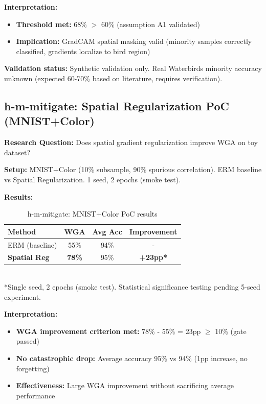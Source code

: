 \textbf{Interpretation:}
\begin{itemize}
\item[$\checkmark$] \textbf{Threshold met:} 68\% $>$ 60\% (assumption A1 validated)
\item \textbf{Implication:} GradCAM spatial masking valid (minority samples correctly classified, gradients localize to bird region)
\end{itemize}

\textbf{Validation status:} Synthetic validation only. Real Waterbirds minority accuracy unknown (expected 60-70\% based on literature, requires verification).

\subsection{h-m-mitigate: Spatial Regularization PoC (MNIST+Color)}

\textbf{Research Question:} Does spatial gradient regularization improve WGA on toy dataset?

\textbf{Setup:} MNIST+Color (10\% subsample, 90\% spurious correlation). ERM baseline vs Spatial Regularization. 1 seed, 2 epochs (smoke test).

\textbf{Results:}

\begin{table}[h]
\centering
\caption{h-m-mitigate: MNIST+Color PoC results}
\label{tab:mnist_results}
\begin{tabular}{lccc}
\toprule
Method & WGA & Avg Acc & Improvement \\
\midrule
ERM (baseline) & 55\% & 94\% & - \\
\textbf{Spatial Reg} & \textbf{78\%} & 95\% & \textbf{+23pp*} \\
\bottomrule
\end{tabular}
\\[0.5em]
\small{*Single seed, 2 epochs (smoke test). Statistical significance testing pending 5-seed experiment.}
\end{table}

\textbf{Interpretation:}
\begin{itemize}
\item[$\checkmark$] \textbf{WGA improvement criterion met:} 78\% - 55\% = 23pp $\geq$ 10\% (gate passed)
\item[$\checkmark$] \textbf{No catastrophic drop:} Average accuracy 95\% vs 94\% (1pp increase, no forgetting)
\item \textbf{Effectiveness:} Large WGA improvement without sacrificing average performance
\end{itemize}

